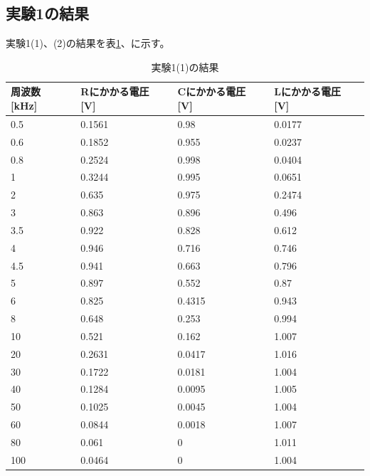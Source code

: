 \documentclass[11pt,a4paper,fleqn]{jsarticle}
\begin{document}
\subsection{実験1の結果}
実験1(1)、(2)の結果を表\ref{cal:result1(1)}、に示す。
\begin{table}[]
\centering
\caption{実験1(1)の結果}
\label{cal:result1(1)}
\begin{tabular}{|l|l|l|l|}
\hline
周波数 {[}kHz{]} & Rにかかる電圧 {[}V{]} & Cにかかる電圧 {[}V{]} & Lにかかる電圧 {[}V{]} \\ \hline \hline
0.5           & 0.1561          & 0.98            & 0.0177          \\ \hline
0.6           & 0.1852          & 0.955           & 0.0237          \\ \hline
0.8           & 0.2524          & 0.998           & 0.0404          \\ \hline
1             & 0.3244          & 0.995           & 0.0651          \\ \hline
2             & 0.635           & 0.975           & 0.2474          \\ \hline
3             & 0.863           & 0.896           & 0.496           \\ \hline
3.5           & 0.922           & 0.828           & 0.612           \\ \hline
4             & 0.946           & 0.716           & 0.746           \\ \hline
4.5           & 0.941           & 0.663           & 0.796           \\ \hline
5             & 0.897           & 0.552           & 0.87            \\ \hline
6             & 0.825           & 0.4315          & 0.943           \\ \hline
8             & 0.648           & 0.253           & 0.994           \\ \hline
10            & 0.521           & 0.162           & 1.007           \\ \hline
20            & 0.2631          & 0.0417          & 1.016           \\ \hline
30            & 0.1722          & 0.0181          & 1.004           \\ \hline
40            & 0.1284          & 0.0095          & 1.005           \\ \hline
50            & 0.1025          & 0.0045          & 1.004           \\ \hline
60            & 0.0844          & 0.0018          & 1.007           \\ \hline
80            & 0.061           & 0               & 1.011           \\ \hline
100           & 0.0464          & 0               & 1.004           \\ \hline
\end{tabular}
\end{table}
\end{document}
